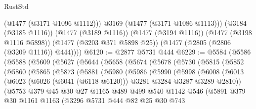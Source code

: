 \begin{lexlean}{RustStd}
\begin{coremodule}
            (@1477 (@3171 @1096 @1112)))
          @3169
          (@1477 (@3171 @1086 @1113)))
        (@3184 (@3185 @1116))
        (@1477 (@3189 @1116))
        (@1477 (@3194 @1116))
        (@1477 (@3198 @1116 @5898))
        (@1477 (@3203 @371 @5898 @25))
        (@1477 (@2805 (@2806 (@3209 @1116)) @444))))
@6120 := @2877 @5731 @444
@6229 := @5584
    (@5586
      (@5588
        (@5609
          (@5627
            (@5644
              (@5658
                (@5674
                  (@5678
                    (@5730
                      (@5815
                        (@5852
                          (@5860
                            (@5865
                              (@5873
                                (@5881
                                  (@5980
                                    (@5986
                                      (@5990
                                        (@5998
                                          (@6008
                                            (@6013
                                              (@6023
                                                (@6026 (@6041 (@6118 @6120)))
                                                @3281
                                                @3284
                                                @3287
                                                @3289
                                                @2810))
                                            (@5753
                                              @379
                                              @45
                                              @30
                                              @27
                                              @1165
                                              @489
                                              @499
                                              @540
                                              @1142
                                              @546
                                              (@5891
                                                @379
                                                @30
                                                @1161
                                                @1163
                                                (@3296
                                                  @5731
                                                  @444
                                                  @82
                                                  @25
                                                  @30
                                                  @743

\end{coremodule}
\end{lexlean}
